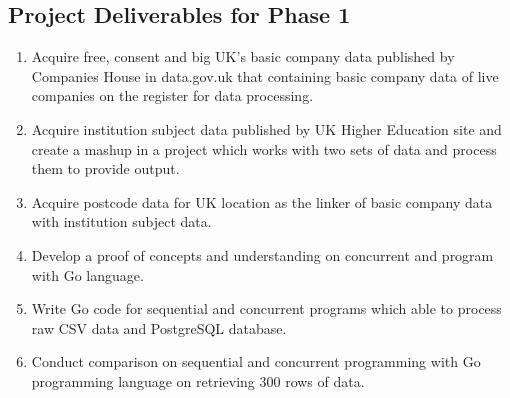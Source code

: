 \subsection{Project Deliverables for Phase 1}

\begin{enumerate}[topsep=0pt,itemsep=-1ex,partopsep=1ex,parsep=1.5ex]
\item Acquire free, consent and big UK’s basic company data published by Companies House in data.gov.uk that containing basic company data of live companies on the register for data processing.
\item Acquire institution subject data published by UK Higher Education site and create a mashup in a project which works with two sets of data and process them to provide output. 
\item Acquire postcode data for UK location as the linker of basic company data with institution subject data. 
\item Develop a proof of concepts and understanding on concurrent and program with Go language.
\item Write Go code for sequential and concurrent programs which able to process raw CSV data and PostgreSQL database. 
\item Conduct comparison on sequential and concurrent programming with Go programming language on retrieving 300 rows of data. 

\end{enumerate}

%
%
%

